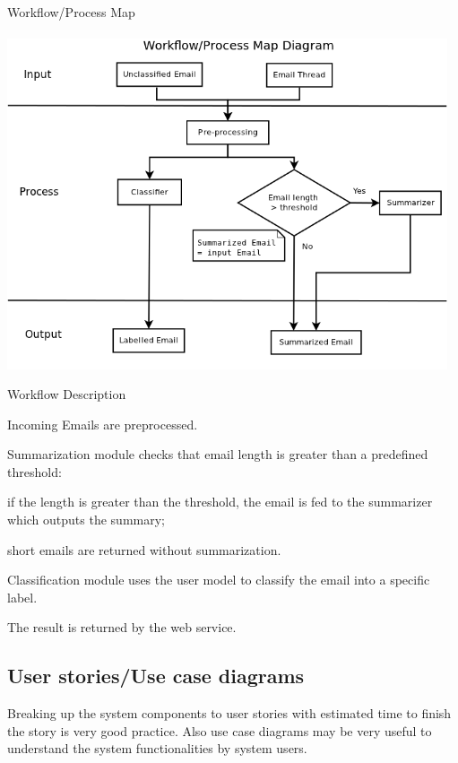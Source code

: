 \documentclass[a4paper,10pt]{article}
\newenvironment{my_itemize}
{\begin{itemize}
  \setlength{\itemsep}{0cm}
  \setlength{\parskip}{0cm}}
{\end{itemize}}
\newenvironment{my_enumerate}
{\begin{enumerate}
  \setlength{\itemsep}{0cm}
  \setlength{\parskip}{0cm}}
{\end{enumerate}}
\begin{document}
\begin{my_enumerate}
  \item Workflow/Process Map \\ \\
	\includegraphics[width=13cm]{workflow_process_map.png}
  \item Workflow Description
  \begin{my_itemize}
    \item Incoming Emails are preprocessed.
    \item Summarization module checks that email length is greater than a predefined threshold:
    \begin{my_itemize}
      \item if the length is greater than the threshold, the email is fed to the 
	    summarizer which outputs the summary;
      \item short emails are returned without summarization.
    \end{my_itemize}
    \item Classification module uses the user model to classify the email into a specific label.
    \item The result is returned by the web service.
  \end{my_itemize}
\end{my_enumerate}

\subsection{User stories/Use case diagrams}
Breaking up the system components to user stories with estimated time to finish
the story is very good practice. Also use case diagrams may be very useful to understand
the system functionalities by system users.
\\
\end{document}
